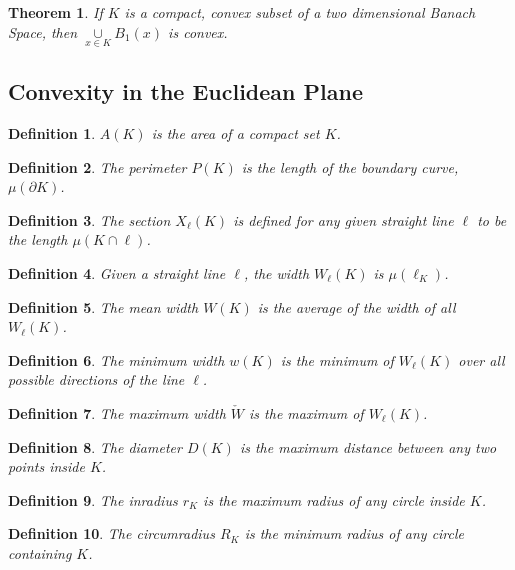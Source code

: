 \documentclass[12pt,oneside]{book}
\theoremstyle{mystyle}
\newtheorem{theorem}{Theorem}[section]
\newtheorem{definition}{Definition}[section]
\begin{document}
\begin{theorem}
If $K$ is a compact, convex subset of a two dimensional Banach Space, then $\underset{x\in K}\cup B_{1}(x)$ is convex.
\end{theorem}
%
\subsection{Convexity in the Euclidean Plane}
%
\begin{definition}
$A(K)$ is the area of a compact set $K$.
\end{definition}
%
\begin{definition}
The perimeter $P(K)$ is the length of the boundary curve, $\mu(\partial K)$.
\end{definition}

\begin{definition}
The section $X_{\ell}(K)$ is defined for any given straight line $\ell$ to be the length $\mu(K\cap \ell)$.
\end{definition}

\begin{definition}
Given a straight line $\ell$, the width $W_{\ell}(K)$ is $\mu(\ell_{K})$.
\end{definition}

\begin{definition}
The mean width $W(K)$ is the average of the width of all $W_{\ell}(K)$.
\end{definition}

\begin{definition}
The minimum width $w(K)$ is the minimum of $W_{\ell}(K)$ over all possible directions of the line $\ell$.
\end{definition}

\begin{definition}
The maximum width $\check{W}$ is the maximum of $W_{\ell}(K)$.
\end{definition}

\begin{definition}
The diameter $D(K)$ is the maximum distance between any two points inside $K$.
\end{definition}

\begin{definition}
The inradius $r_K$ is the maximum radius of any circle inside $K$.
\end{definition}

\begin{definition}
The circumradius $R_K$ is the minimum radius of any circle containing $K$.
\end{definition}
\end{document}
